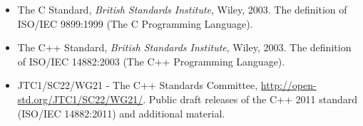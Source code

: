 \documentclass[a4paper]{scrartcl}
\begin{document}
\begin{itemize}
	\item The C Standard, \emph{British Standards Institute}, Wiley, 2003. The definition of ISO/IEC 9899:1999 (The C Programming Language).
	\item The C++ Standard, \emph{British Standards Institute}, Wiley, 2003. The definition of ISO/IEC 14882:2003 (The C++ Programming Language).
	\item JTC1/SC22/WG21 - The C++ Standards Committee, \url{http://open-std.org/JTC1/SC22/WG21/}. Public draft releases of the C++ 2011 standard (ISO/IEC 14882:2011) and additional material.
\end{itemize}
\end{document}

